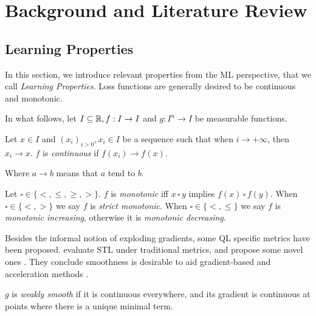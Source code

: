 \section{Background and Literature Review} \label{section:LiteratureReview}
\label{Background}

\subsection{Learning Properties}

In this section, we introduce relevant properties from the ML perspective, that we call \textit{Learning Properties}. Loss functions are generally desired to be continuous and monotonic. 

In what follows, let $I \subseteq \mathbb{R}, f : I \rightarrow I$ and $g : I^{n} \rightarrow I$ be measurable functions.

\begin{definition}[Continuity]
    Let $x \in I$ and $(x_i)_{i > 0}, x_i \in I$ be a sequence such that when $i \longrightarrow +\infty$, then $x_i \longrightarrow x$. $f$ is \textit{continuous} if $f(x_i) \longrightarrow f(x)$.

    Where $a \longrightarrow b$ means that $a$ tend to $b$.
\end{definition}
  
\begin{definition}[Monotonicity]
    Let $\square \in \{<, \leq, \geq, >\}$. $f$ is \textit{monotonic} iff $x \,\square\, y$ implies $f(x) \,\square\, f(y)$. When $\square \in \{<,>\}$ we say $f$ is \textit{strict monotonic}. When $\square \in \{<,\leq\}$ we say $f$ is \textit{monotonic increasing}, otherwise it is \textit{monotonic decreasing}.
\end{definition}

Besides the informal notion of exploding gradients, some QL specific metrics have been proposed. \citeauthor{varnai2020robustness} evaluate STL under traditional metrics, and propose some novel ones \citep{varnai2020robustness}. They conclude smoothness is desirable to aid gradient-based and acceleration methods \citep{varnai2020robustness}.

\begin{definition}
    $g$ is \textit{weakly smooth} if it is continuous everywhere, and its gradient is continuous at points where there is a unique minimal term.
\end{definition}


